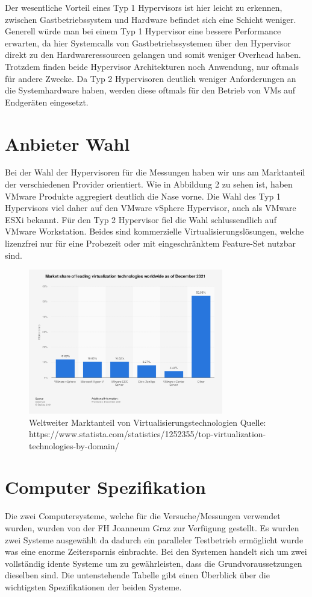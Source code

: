 \documentclass[conference]{IEEEtran}
\begin{document}
Der wesentliche Vorteil eines Typ 1 Hypervisors ist hier leicht zu erkennen, zwischen Gastbetriebssystem und Hardware befindet sich eine Schicht weniger. Generell würde man bei einem Typ 1 Hypervisor eine bessere Performance erwarten, da hier Systemcalls von Gastbetriebssystemen über den Hypervisor direkt zu den Hardwareressourcen gelangen und somit weniger Overhead haben. Trotzdem finden beide Hypervisor Architekturen noch Anwendung, nur oftmals für andere Zwecke. Da Typ 2 Hypervisoren deutlich weniger Anforderungen an die Systemhardware haben, werden diese oftmals für den Betrieb von VMs auf Endgeräten eingesetzt.

\section{Anbieter Wahl}
\label{Anbieter Wahl}
Bei der Wahl der Hypervisoren für die Messungen haben wir uns am Marktanteil der verschiedenen Provider orientiert. Wie in Abbildung 2 zu sehen ist, haben VMware Produkte aggregiert deutlich die Nase vorne. Die Wahl des Typ 1 Hypervisors viel daher auf den VMware vSphere Hypervisor, auch als VMware ESXi bekannt. Für den Typ 2 Hypervisor fiel die Wahl schlussendlich auf VMware Workstation. Beides sind kommerzielle Virtualisierungslösungen, welche lizenzfrei nur für eine Probezeit oder mit eingeschränktem Feature-Set nutzbar sind.

\begin{figure}[h!]
	\centering
	\includegraphics[keepaspectratio,width=8.5cm,height=0.75\textheight]{hypervisor_marketshare.png}
	\caption{Weltweiter Marktanteil von Virtualisierungstechnologien  \linebreak Quelle: https://www.statista.com/statistics/1252355/top-virtualization-technologies-by-domain/}
	\label{marketshare}
\end{figure}

\section{Computer Spezifikation}
\label{Computer Spezifikation}
Die zwei Computersysteme, welche für die Versuche/Messungen verwendet wurden, wurden von der FH Joanneum Graz zur Verfügung gestellt. Es wurden zwei Systeme ausgewählt da dadurch ein paralleler Testbetrieb ermöglicht wurde was eine enorme Zeitersparnis einbrachte. Bei den Systemen handelt sich um zwei vollständig idente Systeme um zu gewährleisten, dass die Grundvoraussetzungen dieselben sind. Die untenstehende Tabelle gibt einen Überblick über die wichtigsten Spezifikationen der beiden Systeme.
\end{document}
